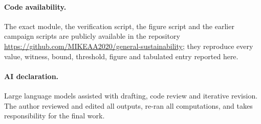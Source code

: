 \documentclass[11pt,a4paper]{article}
\theoremstyle{plain}
\theoremstyle{definition}
\theoremstyle{remark}
\begin{document}
\paragraph{Code availability.} The exact module, the verification script, the figure script and the earlier campaign scripts are publicly available in the repository \url{https://github.com/MIKEAA2020/general-sustainability}; they reproduce every value, witness, bound, threshold, figure and tabulated entry reported here.
\paragraph{AI declaration.} Large language models assisted with drafting, code review and iterative revision. The author reviewed and edited all outputs, re-ran all computations, and takes responsibility for the final work.
\end{document}
